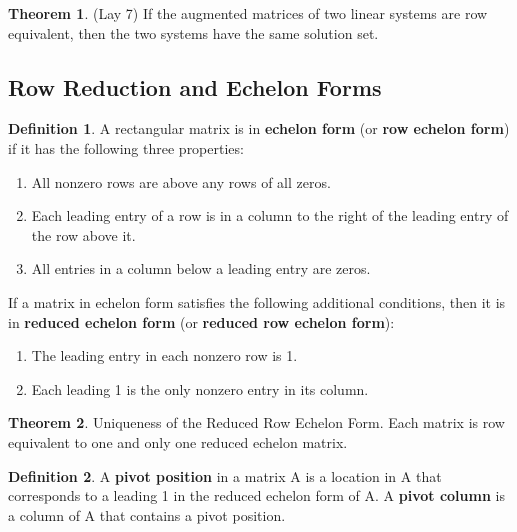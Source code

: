 \documentclass[12pt]{article}
\theoremstyle{definition}
\newtheorem{theorem}{Theorem}  %
\newtheorem{definition}{Definition} %
\numberwithin{equation}{theorem}    %
\begin{document}
\begin{theorem}(Lay 7)
    If the augmented matrices of two linear systems are row equivalent, then the two systems have the same solution set.
\end{theorem}

\subsection{Row Reduction and Echelon Forms}

\begin{definition}
    A rectangular matrix is in \textbf{echelon form} (or \textbf{row echelon form}) if it has the following three properties:
    \begin{enumerate}
        \item All nonzero rows are above any rows of all zeros.
        \item Each leading entry of a row is in a column to the right of the leading entry of the row above it.
        \item All entries in a column below a leading entry are zeros.
    \end{enumerate}
    If a matrix in echelon form satisfies the following additional conditions, then it is in \textbf{reduced echelon form} (or \textbf{reduced row echelon form}):
    \begin{enumerate}[resume]
        \item The leading entry in each nonzero row is 1.
        \item Each leading 1 is the only nonzero entry in its column.
    \end{enumerate}
\end{definition}

\begin{theorem}
    Uniqueness of the Reduced Row Echelon Form.
    Each matrix is row equivalent to one and only one reduced echelon matrix.
\end{theorem}

\begin{definition}
    A \textbf{pivot position} in a matrix A is a location in A that corresponds to a leading 1 in the reduced echelon form of A. A \textbf{pivot column} is a column of A that contains a pivot position.
\end{definition}
\end{document}
